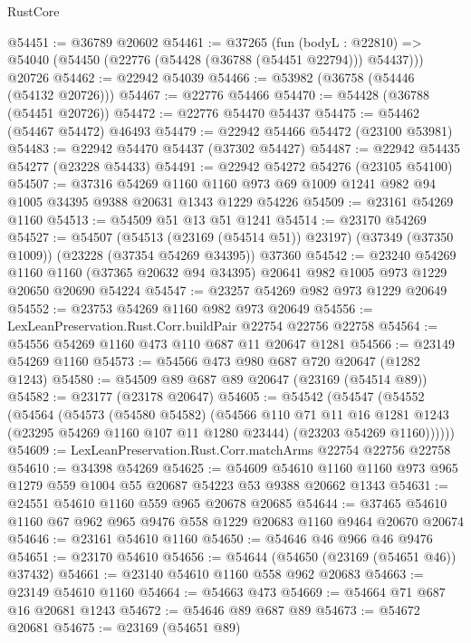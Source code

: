 \begin{lexlean}{RustCore}
\begin{coremodule}
@54451 := @36789 @20602
@54461 := @37265
    (fun (bodyL : @22810) => @54040 (@54450 (@22776 (@54428 (@36788 (@54451 @22794))) @54437)))
    @20726
@54462 := @22942 @54039
@54466 := @53982 (@36758 (@54446 (@54132 @20726)))
@54467 := @22776 @54466
@54470 := @54428 (@36788 (@54451 @20726))
@54472 := @22776 @54470 @54437
@54475 := @54462 (@54467 @54472) @46493
@54479 := @22942 @54466 @54472 (@23100 @53981)
@54483 := @22942 @54470 @54437 (@37302 @54427)
@54487 := @22942 @54435 @54277 (@23228 @54433)
@54491 := @22942 @54272 @54276 (@23105 @54100)
@54507 := @37316
    @54269
    @1160
    @1160
    @973
    @69
    @1009
    @1241
    @982
    @94
    @1005
    @34395
    @9388
    @20631
    @1343
    @1229
    @54226
@54509 := @23161 @54269 @1160
@54513 := @54509 @51 @13 @51 @1241
@54514 := @23170 @54269
@54527 := @54507
    (@54513 (@23169 (@54514 @51)) @23197)
    (@37349 (@37350 @1009))
    (@23228 (@37354 @54269 @34395))
    @37360
@54542 := @23240
    @54269
    @1160
    @1160
    (@37365 @20632 @94 @34395)
    @20641
    @982
    @1005
    @973
    @1229
    @20650
    @20690
    @54224
@54547 := @23257 @54269 @982 @973 @1229 @20649
@54552 := @23753 @54269 @1160 @982 @973 @20649
@54556 := LexLeanPreservation.Rust.Corr.buildPair @22754 @22756 @22758
@54564 := @54556 @54269 @1160 @473 @110 @687 @11 @20647 @1281
@54566 := @23149 @54269 @1160
@54573 := @54566 @473 @980 @687 @720 @20647 (@1282 @1243)
@54580 := @54509 @89 @687 @89 @20647 (@23169 (@54514 @89))
@54582 := @23177 (@23178 @20647)
@54605 := @54542
    (@54547
      (@54552
        (@54564
          (@54573
            (@54580 @54582)
            (@54566
              @110
              @71
              @11
              @16
              @1281
              @1243
              (@23295 @54269 @1160 @107 @11 @1280 @23444)
              (@23203 @54269 @1160))))))
@54609 := LexLeanPreservation.Rust.Corr.matchArms @22754 @22756 @22758
@54610 := @34398 @54269
@54625 := @54609
    @54610
    @1160
    @1160
    @973
    @965
    @1279
    @559
    @1004
    @55
    @20687
    @54223
    @53
    @9388
    @20662
    @1343
@54631 := @24551 @54610 @1160 @559 @965 @20678 @20685
@54644 := @37465 @54610 @1160 @67 @962 @965 @9476 @558 @1229 @20683 @1160 @9464 @20670 @20674
@54646 := @23161 @54610 @1160
@54650 := @54646 @46 @966 @46 @9476
@54651 := @23170 @54610
@54656 := @54644 (@54650 (@23169 (@54651 @46)) @37432)
@54661 := @23140 @54610 @1160 @558 @962 @20683
@54663 := @23149 @54610 @1160
@54664 := @54663 @473
@54669 := @54664 @71 @687 @16 @20681 @1243
@54672 := @54646 @89 @687 @89
@54673 := @54672 @20681
@54675 := @23169 (@54651 @89)

\end{coremodule}
\end{lexlean}
